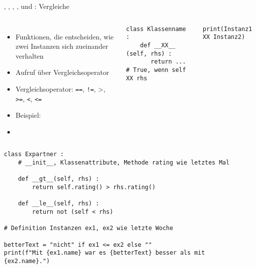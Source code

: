 
\begin{frame}[fragile]{, , , ,  und : Vergleiche}
%
\begin{columns}[T]
\begin{itemize}
\item Funktionen, die entscheiden, wie zwei Instanzen sich zueinander verhalten
\item Aufruf über Vergleichsoperator
\item Vergleichsoperator: \texttt{==}, \texttt{!=}, >, \texttt{>=}, \texttt{<}, \texttt{<=}
\item Beispiel:  
\item[\Thus] 
\end{itemize}
%
\begin{codebox}
\begin{verbatim}
class Klassenname :
    def __XX__ (self, rhs) :
       return ... # True, wenn self XX rhs
\end{verbatim}
\end{codebox}
%
\begin{codebox}
\begin{verbatim}
print(Instanz1 XX Instanz2)
\end{verbatim}
\end{codebox}
\end{columns}
%
\end{frame}


\begin{frame}[fragile]
%
\begin{codebox}
\begin{verbatim}
class Expartner :
    # __init__, Klassenattribute, Methode rating wie letztes Mal
    
    def __gt__(self, rhs) :
        return self.rating() > rhs.rating()
    
    def __le__(self, rhs) :
        return not (self < rhs)

# Definition Instanzen ex1, ex2 wie letzte Woche

betterText = "nicht" if ex1 <= ex2 else ""
print(f"Mit {ex1.name} war es {betterText} besser als mit {ex2.name}.")
\end{verbatim}
\end{codebox}
%
\end{frame}

